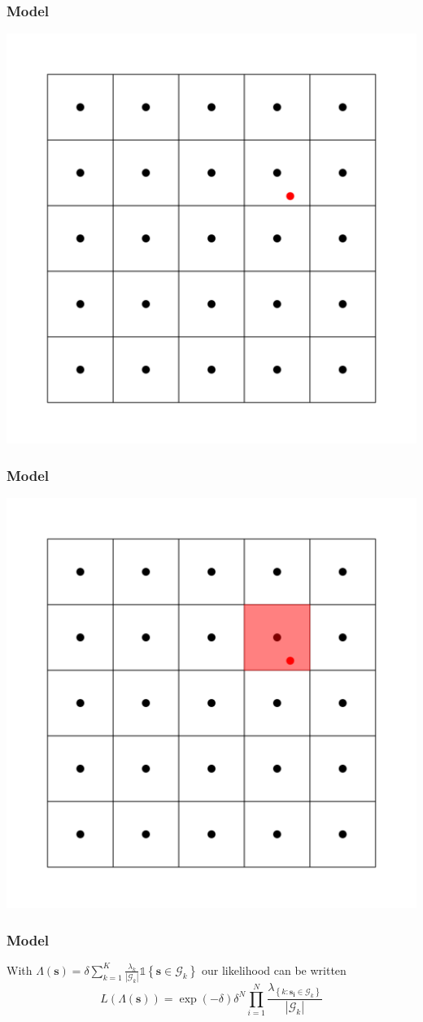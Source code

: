 \documentclass[10pt, compress]{beamer}
\begin{document}
  \begin{frame}
    \frametitle{Model}
    \centering
    \includegraphics[height=0.8\textheight]{grid_spot.pdf}
  \end{frame}
  \begin{frame}
    \frametitle{Model}
    \centering
    \includegraphics[height=0.8\textheight]{grid_spot_highlighted.pdf}
  \end{frame}
  \begin{frame}
    \frametitle{Model}
    With $\Lambda(\mathbf{s}) = \delta \sum_{k=1}^K \frac{\lambda_k}{|\mathcal{G}_k|} \mathds{1} \left\{ \mathbf{s} \in \mathcal{G}_k \right\}$ our likelihood can be written
    $$L(\Lambda(\mathbf{s})) = \exp\left(-\delta\right) \delta^N \prod_{i=1}^{N}\frac{\lambda_{\left\{k: \mathbf{s_i} \in \mathcal{G}_k \right\}}}{|\mathcal{G}_k|}$$   
  \end{frame}
\end{document}
